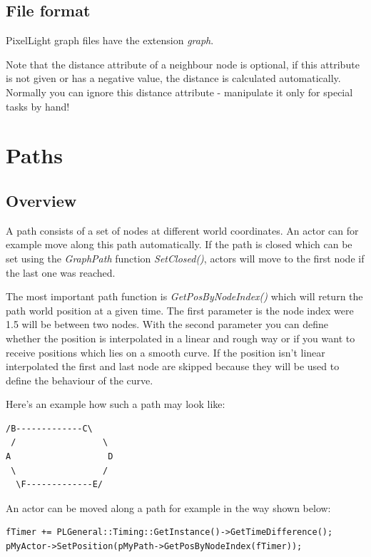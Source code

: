 \subsection{File format}
PixelLight graph files have the extension \emph{graph}.

Note that the distance attribute of a neighbour node is optional, if this attribute is not given or has a negative value, the distance is calculated automatically. Normally you can ignore this distance attribute - manipulate it only for special tasks by hand!





\section{Paths}



\subsection{Overview}
A path consists of a set of nodes at different world coordinates. An actor can for example move along this path automatically. If the path is closed which can be set using the \emph{GraphPath} function \emph{SetClosed()}, actors will move to the first node if the last one was reached.

The most important path function is \emph{GetPosByNodeIndex()} which will return the path world position at a given time. The first parameter is the node index were 1.5 will be between two nodes. With the second parameter you can define whether the position is interpolated in a linear and rough way or if you want to receive positions which lies on a smooth curve. If the position isn't linear interpolated the first and last node are skipped because they will be used to define the behaviour of the curve.

Here's an example how such a path may look like:

\begin{lstlisting}[caption=Path example]
  /B-------------C\
 /                 \
A                   D
 \                 /
  \F-------------E/
\end{lstlisting}

An actor can be moved along a path for example in the way shown below:

\begin{lstlisting}[caption=Moving along path]
fTimer += PLGeneral::Timing::GetInstance()->GetTimeDifference();
pMyActor->SetPosition(pMyPath->GetPosByNodeIndex(fTimer));
\end{lstlisting}


